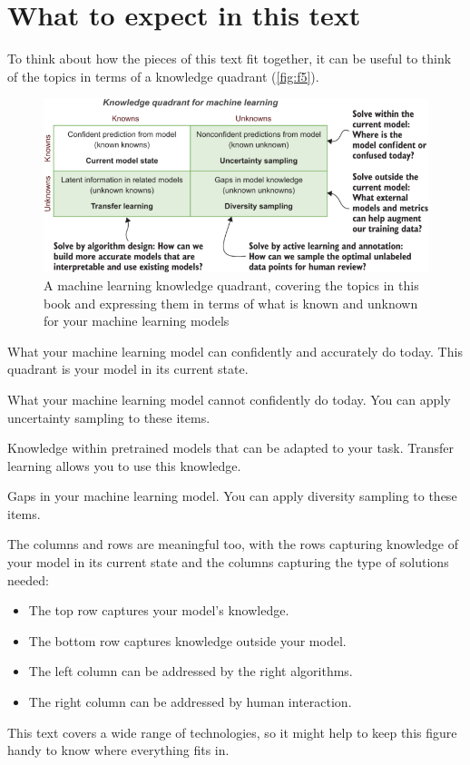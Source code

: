 \documentclass[sigconf,nonacm,screen,pbalance]{acmart}
\begin{document}
\section{What to expect in this text}
To
think
about how the pieces of this text fit together, it can be useful to think of the topics
in terms of a knowledge quadrant (\autoref{fig:f5}).

\begin{figure}[ht]
\centering
\vspace{-5pt}
\includegraphics[width=\columnwidth]{CH01_F05_Munro.png}
\vspace{-20pt}
\caption{A machine learning knowledge quadrant, covering the topics in this book and
expressing them in terms of what is known and unknown for your machine learning models}
\vspace{-10pt}
\label{fig:f5}
\end{figure}


 What
your machine learning model can confidently and accurately do today. This quadrant
is your model in its current state.

 What
your machine learning model cannot confidently do today. You can apply uncertainty
sampling to these items.

 Knowledge
within pretrained models that can be adapted to your task. Transfer learning allows
you to use this knowledge.

 Gaps
in your machine learning model. You can apply diversity sampling to these items.

The
columns and rows are meaningful too, with the rows capturing knowledge of your model in
its current state and the columns capturing the type of solutions needed:
\begin{itemize}
    \item 
    The top row captures your model's knowledge.
    \item 
    The bottom row captures knowledge outside your model.
    \item 
    The left column can be addressed by the right algorithms.
    \item 
    The right column can be addressed by human interaction.
\end{itemize}
This
text covers a wide range of technologies, so it might help to keep this figure handy to
know where everything fits in.
\end{document}
